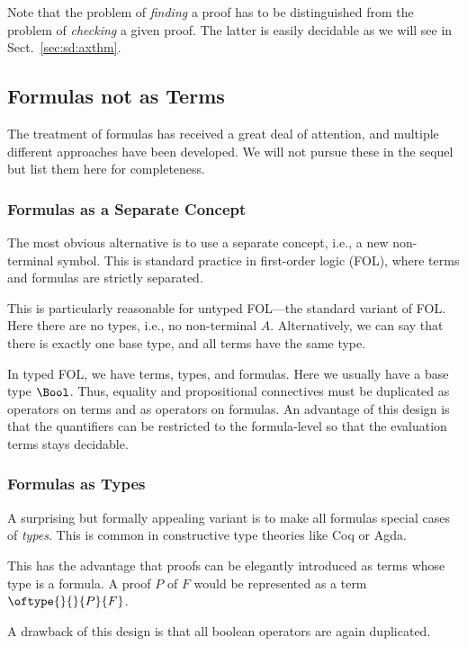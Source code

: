 Note that the problem of \emph{finding} a proof has to be distinguished from the problem of \emph{checking} a given proof.
The latter is easily decidable as we will see in Sect.~\ref{sec:sd:axthm}.

\subsection{Formulas not as Terms}

The treatment of formulas has received a great deal of attention, and multiple different approaches have been developed.
We will not pursue these in the sequel but list them here for completeness.

\subsubsection{Formulas as a Separate Concept}

The most obvious alternative is to use a separate concept, i.e., a new non-terminal symbol.
This is standard practice in first-order logic (FOL), where terms and formulas are strictly separated.

This is particularly reasonable for untyped FOL---the standard variant of FOL.
Here there are no types, i.e., no non-terminal $A$.
Alternatively, we can say that there is exactly one base type, and all terms have the same type.

In typed FOL, we have terms, types, and formulas.
Here we usually have a base type $\Bool$.
Thus, equality and propositional connectives must be duplicated as operators on terms and as operators on formulas.
An advantage of this design is that the quantifiers can be restricted to the formula-level so that the evaluation terms stays decidable.

\subsubsection{Formulas as Types}

A surprising but formally appealing variant is to make all formulas special cases of \emph{types}.
This is common in constructive type theories like Coq or Agda.

This has the advantage that proofs can be elegantly introduced as terms whose type is a formula.
A proof $P$ of $F$ would be represented as a term $\oftype{}{}{P}{F}$.

A drawback of this design is that all boolean operators are again duplicated.

